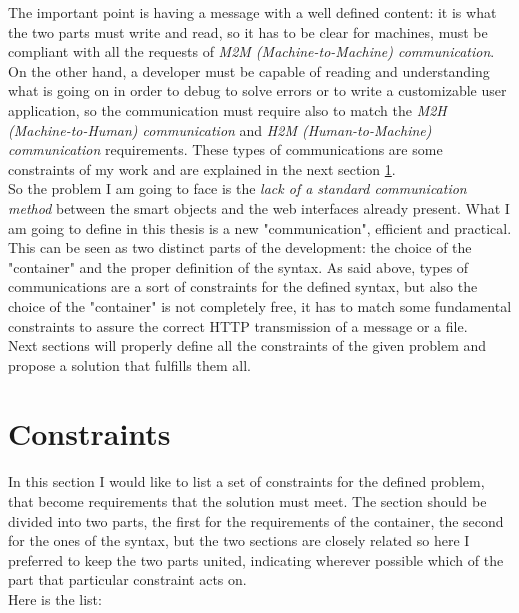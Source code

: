 The important point is having a message with a well defined content: it is what the two parts must write and read, so it has to be clear for machines, must be compliant with all the requests of \textit{M2M (Machine-to-Machine) communication}. On the other hand, a developer must be capable of reading and understanding what is going on in order to debug to solve errors or to write a customizable user application, so the communication must require also to match the \textit{M2H (Machine-to-Human) communication} and \textit{H2M (Human-to-Machine) communication} requirements. These types of communications are some constraints of my work and are explained in the next section \ref{problemconstraints}. \\
So the problem I am going to face is the \textit{lack of a standard communication method} between the smart objects and the web interfaces already present. What I am going to define in this thesis is a new "communication", efficient and practical. This can be seen as two distinct parts of the development: the choice of the "container" and the proper definition of the syntax. As said above, types of communications are a sort of constraints for the defined syntax, but also the choice of the "container" is not completely free, it has to match some fundamental constraints to assure the correct HTTP transmission of a message or a file. \\
Next sections will properly define all the constraints of the given problem and propose a solution that fulfills them all.

\section{Constraints} \label{problemconstraints}
In this section I would like to list a set of  constraints for the defined problem, that become requirements that the solution must meet. The section should be divided into two parts, the first for the requirements of the container, the second for the ones of the syntax, but the two sections are closely related so here I preferred to keep the two parts united, indicating wherever possible which of the part that particular constraint acts on.\\
Here is the list:

